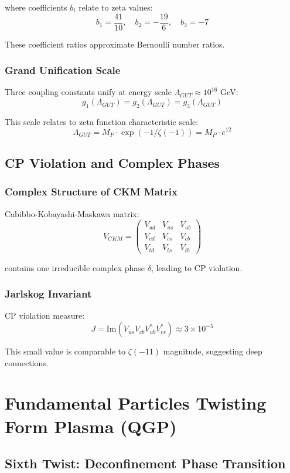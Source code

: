 \documentclass[11pt]{article}
\begin{document}
where coefficients $b_i$ relate to zeta values:
$$b_1 = \frac{41}{10}, \quad b_2 = -\frac{19}{6}, \quad b_3 = -7$$

These coefficient ratios approximate Bernoulli number ratios.

\subsubsection{Grand Unification Scale}

Three coupling constants unify at energy scale $\Lambda_{GUT} \approx 10^{16}$ GeV:
$$g_1(\Lambda_{GUT}) = g_2(\Lambda_{GUT}) = g_3(\Lambda_{GUT})$$

This scale relates to zeta function characteristic scale:
$$\Lambda_{GUT} = M_P \cdot \exp(-1/\zeta(-1)) = M_P \cdot e^{12}$$

\subsection{CP Violation and Complex Phases}

\subsubsection{Complex Structure of CKM Matrix}

Cabibbo-Kobayashi-Maskawa matrix:
$$V_{CKM} = \begin{pmatrix}
V_{ud} & V_{us} & V_{ub} \\
V_{cd} & V_{cs} & V_{cb} \\
V_{td} & V_{ts} & V_{tb}
\end{pmatrix}$$

contains one irreducible complex phase $\delta$, leading to CP violation.

\subsubsection{Jarlskog Invariant}

CP violation measure:
$$J = \text{Im}(V_{us} V_{cb} V_{ub}^* V_{cs}^*) \approx 3 \times 10^{-5}$$

This small value is comparable to $\zeta(-11)$ magnitude, suggesting deep connections.

\section{Fundamental Particles Twisting Form Plasma (QGP)}

\subsection{Sixth Twist: Deconfinement Phase Transition}
\end{document}

